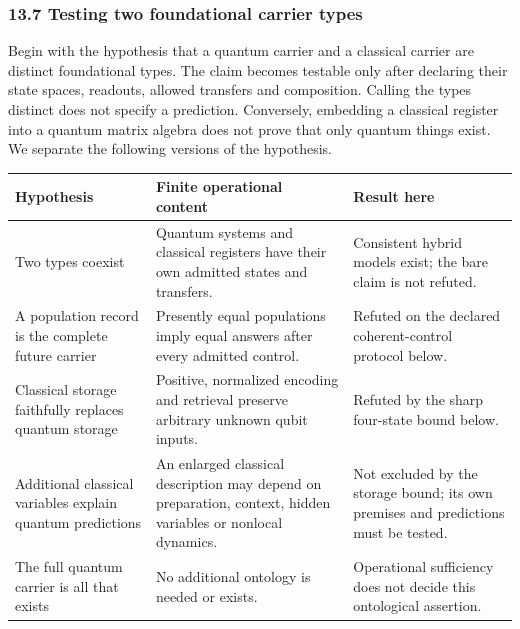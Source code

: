 \documentclass[
  11pt,
]{article}
\begin{document}
\subsubsection{13.7 Testing two foundational carrier
types}\label{testing-two-foundational-carrier-types}

Begin with the hypothesis that a quantum carrier and a classical carrier
are distinct foundational types. The claim becomes testable only after
declaring their state spaces, readouts, allowed transfers and
composition. Calling the types distinct does not specify a prediction.
Conversely, embedding a classical register into a quantum matrix algebra
does not prove that only quantum things exist. We separate the following
versions of the hypothesis.

\begin{longtable}[]{@{}
  >{\raggedright\arraybackslash}p{}
  >{\raggedright\arraybackslash}p{}
  >{\raggedright\arraybackslash}p{}@{}}
\toprule\noalign{}
\begin{minipage}[b]{\linewidth}\raggedright
Hypothesis
\end{minipage} & \begin{minipage}[b]{\linewidth}\raggedright
Finite operational content
\end{minipage} & \begin{minipage}[b]{\linewidth}\raggedright
Result here
\end{minipage} \\
\midrule\noalign{}
\endhead
\bottomrule\noalign{}
\endlastfoot
Two types coexist & Quantum systems and classical registers have their
own admitted states and transfers. & Consistent hybrid models exist; the
bare claim is not refuted. \\
A population record is the complete future carrier & Presently equal
populations imply equal answers after every admitted control. & Refuted
on the declared coherent-control protocol below. \\
Classical storage faithfully replaces quantum storage & Positive,
normalized encoding and retrieval preserve arbitrary unknown qubit
inputs. & Refuted by the sharp four-state bound below. \\
Additional classical variables explain quantum predictions & An enlarged
classical description may depend on preparation, context, hidden
variables or nonlocal dynamics. & Not excluded by the storage bound; its
own premises and predictions must be tested. \\
The full quantum carrier is all that exists & No additional ontology is
needed or exists. & Operational sufficiency does not decide this
ontological assertion. \\
\end{longtable}
\end{document}

